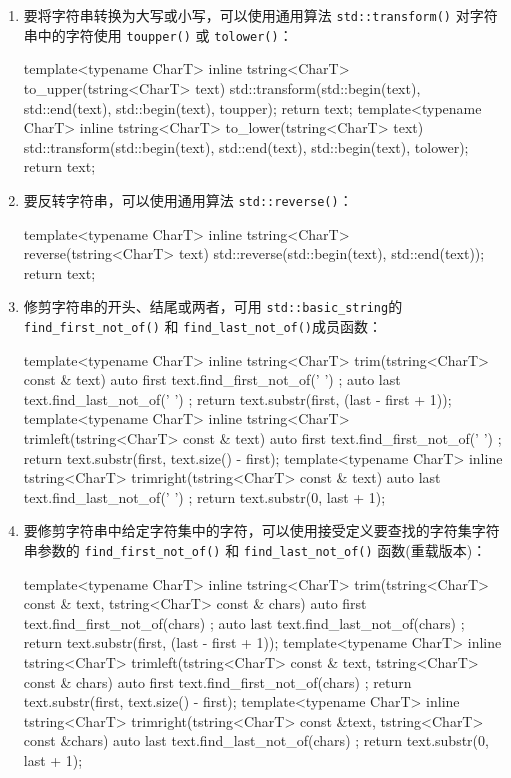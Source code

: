 \begin{enumerate}
\item
要将字符串转换为大写或小写，可以使用通用算法 \verb|std::transform()| 对字符串中的字符使用 \verb|toupper()| 或 \verb|tolower()|：

\begin{cpp}
template<typename CharT>
inline tstring<CharT> to_upper(tstring<CharT> text)
{
    std::transform(std::begin(text), std::end(text),
    std::begin(text), toupper);
    return text;
}
template<typename CharT>
inline tstring<CharT> to_lower(tstring<CharT> text)
{
    std::transform(std::begin(text), std::end(text),
    std::begin(text), tolower);
    return text;
}
\end{cpp}

\item
要反转字符串，可以使用通用算法 \verb|std::reverse()|：

\begin{cpp}
template<typename CharT>
inline tstring<CharT> reverse(tstring<CharT> text)
{
    std::reverse(std::begin(text), std::end(text));
    return text;
}
\end{cpp}

\item
修剪字符串的开头、结尾或两者，可用 \verb|std::basic_string|的 \verb|find_first_not_of()| 和 \verb|find_last_not_of()|成员函数：

\begin{cpp}
template<typename CharT>
inline tstring<CharT> trim(tstring<CharT> const & text)
{
    auto first{ text.find_first_not_of(' ') };
    auto last{ text.find_last_not_of(' ') };
    return text.substr(first, (last - first + 1));
}
template<typename CharT>
inline tstring<CharT> trimleft(tstring<CharT> const & text)
{
    auto first{ text.find_first_not_of(' ') };
    return text.substr(first, text.size() - first);
}
template<typename CharT>
inline tstring<CharT> trimright(tstring<CharT> const & text)
{
    auto last{ text.find_last_not_of(' ') };
    return text.substr(0, last + 1);
}
\end{cpp}

\item
要修剪字符串中给定字符集中的字符，可以使用接受定义要查找的字符集字符串参数的 \verb|find_first_not_of()| 和 \verb|find_last_not_of()| 函数(重载版本)：

\begin{cpp}
template<typename CharT>
inline tstring<CharT> trim(tstring<CharT> const & text,
tstring<CharT> const & chars)
{
    auto first{ text.find_first_not_of(chars) };
    auto last{ text.find_last_not_of(chars) };
    return text.substr(first, (last - first + 1));
}
template<typename CharT>
inline tstring<CharT> trimleft(tstring<CharT> const & text,
tstring<CharT> const & chars)
{
    auto first{ text.find_first_not_of(chars) };
    return text.substr(first, text.size() - first);
}
template<typename CharT>
inline tstring<CharT> trimright(tstring<CharT> const &text,
tstring<CharT> const &chars)
{
    auto last{ text.find_last_not_of(chars) };
    return text.substr(0, last + 1);
}
\end{cpp}


\end{enumerate}
